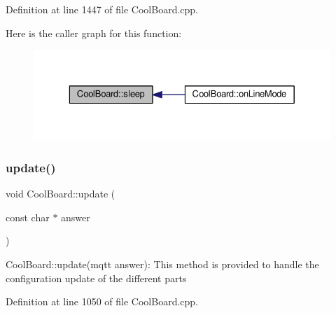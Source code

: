 Definition at line 1447 of file Cool\+Board.\+cpp.

Here is the caller graph for this function\+:
\nopagebreak
\begin{figure}[H]
\begin{center}
\leavevmode
\includegraphics[width=329pt]{class_cool_board_a069952cdcb2e7f68518aa429eceadb6e_icgraph}
\end{center}
\end{figure}
\mbox{\label{class_cool_board_a8612756d3f73198cdde857a66f0fe690}} 
\subsubsection{\texorpdfstring{update()}{update()}}
{\footnotesize\ttfamily void Cool\+Board\+::update (\begin{DoxyParamCaption}\item[{const char $\ast$}]{answer }\end{DoxyParamCaption})}

Cool\+Board\+::update(mqtt answer)\+: This method is provided to handle the configuration update of the different parts 

Definition at line 1050 of file Cool\+Board.\+cpp.

